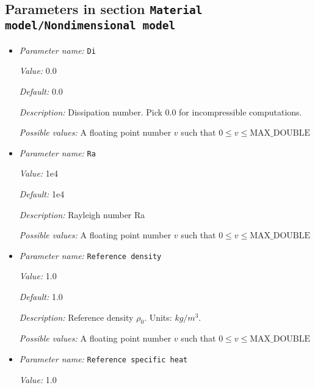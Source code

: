 \subsection{Parameters in section \tt Material model/Nondimensional model}
\label{parameters:Material_20model/Nondimensional_20model}

\begin{itemize}
\item {\it Parameter name:} {\tt Di}
\label{parameters:Material model/Nondimensional model/Di}


{\it Value:} 0.0


{\it Default:} 0.0


{\it Description:} Dissipation number. Pick 0.0 for incompressible computations.


{\it Possible values:} A floating point number $v$ such that $0 \leq v \leq \text{MAX\_DOUBLE}$
\item {\it Parameter name:} {\tt Ra}
\label{parameters:Material model/Nondimensional model/Ra}


{\it Value:} 1e4


{\it Default:} 1e4


{\it Description:} Rayleigh number Ra


{\it Possible values:} A floating point number $v$ such that $0 \leq v \leq \text{MAX\_DOUBLE}$
\item {\it Parameter name:} {\tt Reference density}
\label{parameters:Material model/Nondimensional model/Reference density}


{\it Value:} 1.0


{\it Default:} 1.0


{\it Description:} Reference density $\rho_0$. Units: $kg/m^3$.


{\it Possible values:} A floating point number $v$ such that $0 \leq v \leq \text{MAX\_DOUBLE}$
\item {\it Parameter name:} {\tt Reference specific heat}
\label{parameters:Material model/Nondimensional model/Reference specific heat}


{\it Value:} 1.0



\end{itemize}
